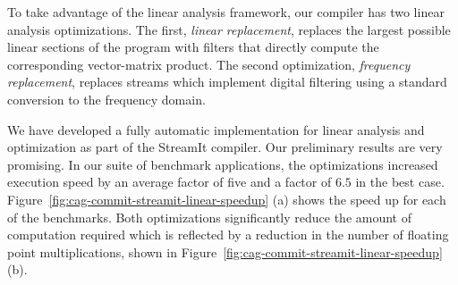 To take advantage of the linear analysis framework, our compiler
has two linear analysis optimizations. The first, {\it linear replacement},
replaces the largest possible linear sections of the program with filters
that directly compute the corresponding vector-matrix product. 
The second optimization, {\it frequency replacement}, replaces streams 
which implement digital filtering using a standard conversion to the 
frequency domain.

We have developed a fully automatic implementation for linear analysis 
and optimization as part of the StreamIt compiler. Our preliminary results
are very promising. In our suite of benchmark applications, the optimizations
increased execution speed by an average factor of five and a factor of $6.5$ 
in the best case. Figure~\ref{fig:cag-commit-streamit-linear-speedup} (a) shows
the speed up for each of the benchmarks. 
Both optimizations significantly reduce the amount of computation required
which is reflected by a reduction in the number of floating 
point multiplications, shown in Figure~\ref{fig:cag-commit-streamit-linear-speedup} (b).

